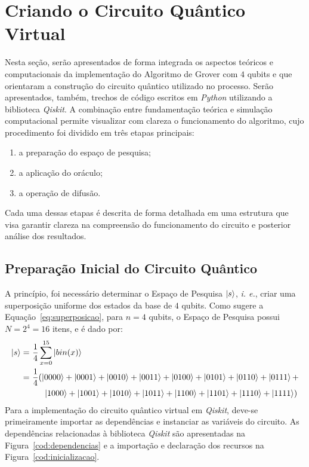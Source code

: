 \section{Criando o Circuito Quântico Virtual}
\label{sec: circuitoVirtual}

Nesta seção, serão apresentados de forma integrada os aspectos teóricos e computacionais da implementação do Algoritmo de Grover com $4$ qubits e que orientaram a construção do circuito quântico utilizado no processo. Serão apresentados, também, trechos de código escritos em \emph{Python} utilizando a biblioteca \emph{Qiskit}. A combinação entre fundamentação teórica e simulação computacional permite visualizar com clareza o funcionamento do algoritmo, cujo procedimento foi dividido em três etapas principais:
\begin{enumerate}
    \item a preparação do espaço de pesquisa;
    \item a aplicação do oráculo;
    \item a operação de difusão.
\end{enumerate}

Cada uma dessas etapas é descrita de forma detalhada em uma estrutura que visa garantir clareza na compreensão do funcionamento do circuito e posterior análise dos resultados.

\subsection{Preparação Inicial do Circuito Quântico}
\label{subSec: preparacaoInicialTeo}

A princípio, foi necessário determinar o Espaço de Pesquisa $\ket{s}$, \emph{i. e.}, criar uma superposição uniforme dos estados da base de $4$ qubits. Como sugere a Equação~\ref{eq:superposicao}, para $n=4$ qubits, o Espaço de Pesquisa possui $N = 2^4 = 16$ itens, e é dado por:
%
\begin{align}
    \label{eq:espacoPesquisa}
    \notag
    \ket{s} =&~ \frac{1}{4} \sum_{x=0}^{15} \ket{bin(x)} \\
     =&~ \frac{1}{4} (\ket{0000} +  \ket{0001} +  \ket{0010} +  \ket{0011} +  \ket{0100} +  \ket{0101} +  \ket{0110} + \ket{0111} +  \\
    \notag{}
     &~~~~~\ket{1000} +  \ket{1001} +  \ket{1010} +  \ket{1011} +  \ket{1100} +  \ket{1101} +  \ket{1110} +  \ket{1111})
\end{align}
%
\tab\tab Para a implementação do circuito quântico virtual em \emph{Qiskit}, deve-se primeiramente importar as dependências e instanciar as variáveis do circuito. As dependências relacionadas à biblioteca \emph{Qiskit} são apresentadas na Figura~\ref{cod:dependencias} e a importação e declaração dos recursos na Figura~\ref{cod:inicializacao}.


